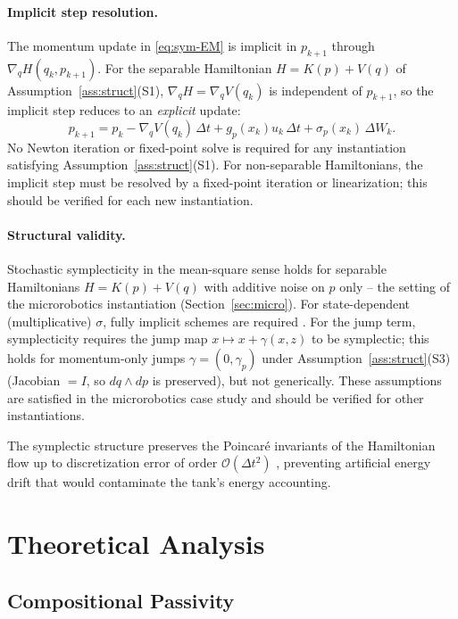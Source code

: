 \documentclass[11pt]{article}
\begin{document}
\paragraph{Implicit step resolution.} The momentum update in \eqref{eq:sym-EM} is implicit in
$p_{k+1}$ through $\nabla_q H(q_k,p_{k+1})$. For the separable Hamiltonian
$H=K(p)+V(q)$ of Assumption~\ref{ass:struct}(S1), $\nabla_q H=\nabla_q V(q_k)$ is
independent of $p_{k+1}$, so the implicit step reduces to an \emph{explicit} update:
\begin{equation}
p_{k+1} = p_k - \nabla_q V(q_k)\,\Delta t + g_p(x_k)u_k\,\Delta t + \sigma_p(x_k)\,\Delta W_k.
\end{equation}
No Newton iteration or fixed-point solve is required for any instantiation satisfying
Assumption~\ref{ass:struct}(S1). For non-separable Hamiltonians, the implicit step must be
resolved by a fixed-point iteration or linearization; this should be verified for each new
instantiation.

\paragraph{Structural validity.} Stochastic symplecticity in the mean-square sense holds for
separable Hamiltonians $H=K(p)+V(q)$ with additive noise on $p$ only \cite{milstein2002} --
the setting of the microrobotics instantiation (Section~\ref{sec:micro}). For state-dependent
(multiplicative) $\sigma$, fully implicit schemes are required \cite{milstein2003}. For the
jump term, symplecticity requires the jump map $x\mapsto x+\gamma(x,z)$ to be symplectic;
this holds for momentum-only jumps $\gamma=(0,\gamma_p)$ under Assumption~\ref{ass:struct}(S3)
(Jacobian $=I$, so $dq\wedge dp$ is preserved), but not generically. These assumptions are
satisfied in the microrobotics case study and should be verified for other instantiations.

The symplectic structure preserves the Poincar\'{e} invariants of the Hamiltonian flow up to
discretization error of order $\mathcal{O}(\Delta t^2)$ \cite{leimkuhler2004}, preventing
artificial energy drift that would contaminate the tank's energy accounting.

\section{Theoretical Analysis}
\label{sec:theory}

\subsection{Compositional Passivity}
\end{document}
